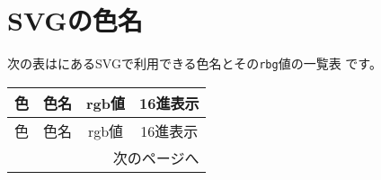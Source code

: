\newcommand{\G}[4]{%
   \raisebox{-1mm}{\rule[-0.5mm]{0mm}{5.mm}%
    \fcolorbox[rgb]{0,0,0}{#4}{\rule{4mm}{0cm}\rule{0cm}{4mm}}}
   &#1
   &\TMP #2 &\texttt{#3}\\\hline}
\newcommand{\TBox}[1]{\makebox[2em][r]{#1}}
\def\TMP(#1,#2,#3){\texttt{rgb(\TBox{#1},\TBox{#2},\TBox{#3})}}
\newcommand{\RGB}[2]{}
\setlength{\fboxrule}{0.1mm}
\setlength{\fboxsep}{0mm}
\chapter{SVGの色名}\label{SVGColor}\setcounter{page}{1}
次の表は\cite{SVG11}にあるSVGで利用できる色名とその\texttt{rbg}値の一覧表
です。
{\small
\begin{longtable}{|c|c|c|c|}
\hline
色&色名&rgb値&16進表示\\\hline
\endfirsthead
\hline
色&色名&rgb値&16進表示\\\hline
\endhead
\multicolumn{4}{r}{次のページへ}
\endfoot
\hline
\endlastfoot

\end{longtable}
}